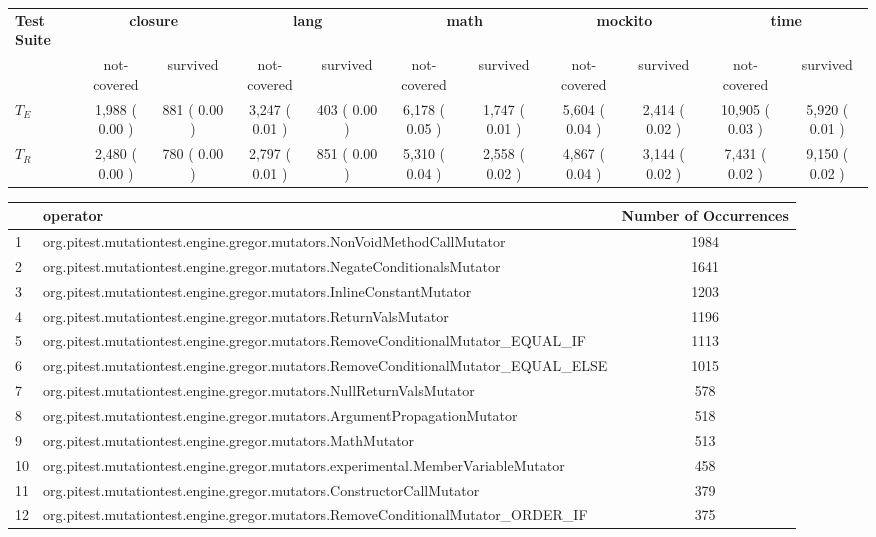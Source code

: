\begin{tabular}{ l | cc | cc | cc | cc | cc }
\hline 
\textbf{Test Suite}& \multicolumn{2}{c}{\textbf{closure}}& \multicolumn{2}{c}{\textbf{lang}}& \multicolumn{2}{c}{\textbf{math}}& \multicolumn{2}{c}{\textbf{mockito}}& \multicolumn{2}{c}{\textbf{time}} \\ 
 & not-covered & survived & not-covered & survived & not-covered & survived & not-covered & survived & not-covered & survived \\ 
\hline 
$T_E$&  1,988 ( 0.00 )&  881 ( 0.00 )&  3,247 ( 0.01 )&  403 ( 0.00 )&  6,178 ( 0.05 )&  1,747 ( 0.01 )&  5,604 ( 0.04 )&  2,414 ( 0.02 )&  10,905 ( 0.03 )&  5,920 ( 0.01 ) \\ 
$T_R$&  2,480 ( 0.00 )&  780 ( 0.00 )&  2,797 ( 0.01 )&  851 ( 0.00 )&  5,310 ( 0.04 )&  2,558 ( 0.02 )&  4,867 ( 0.04 )&  3,144 ( 0.02 )&  7,431 ( 0.02 )&  9,150 ( 0.02 ) \\ 
\hline 
\end{tabular}\begin{tabular}{ l l | c}
\hline 
  & \textbf{operator} & \textbf{Number of Occurrences} \\ 
\hline 
1 & org.pitest.mutationtest.engine.gregor.mutators.NonVoidMethodCallMutator & 1984 \\ 
2 & org.pitest.mutationtest.engine.gregor.mutators.NegateConditionalsMutator & 1641 \\ 
3 & org.pitest.mutationtest.engine.gregor.mutators.InlineConstantMutator & 1203 \\ 
4 & org.pitest.mutationtest.engine.gregor.mutators.ReturnValsMutator & 1196 \\ 
5 & org.pitest.mutationtest.engine.gregor.mutators.RemoveConditionalMutator_EQUAL_IF & 1113 \\ 
6 & org.pitest.mutationtest.engine.gregor.mutators.RemoveConditionalMutator_EQUAL_ELSE & 1015 \\ 
7 & org.pitest.mutationtest.engine.gregor.mutators.NullReturnValsMutator & 578 \\ 
8 & org.pitest.mutationtest.engine.gregor.mutators.ArgumentPropagationMutator & 518 \\ 
9 & org.pitest.mutationtest.engine.gregor.mutators.MathMutator & 513 \\ 
10 & org.pitest.mutationtest.engine.gregor.mutators.experimental.MemberVariableMutator & 458 \\ 
11 & org.pitest.mutationtest.engine.gregor.mutators.ConstructorCallMutator & 379 \\ 
12 & org.pitest.mutationtest.engine.gregor.mutators.RemoveConditionalMutator_ORDER_IF & 375 \\ 

\end{tabular}
